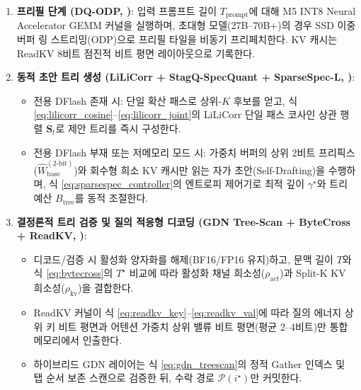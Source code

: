 \documentclass[10pt,a4paper]{article}
\begin{document}
{\begin{enumerate}
  \item \textbf{프리필 단계 (\textsf{DQ-ODP}, \cite{panferov2026dq})}: 입력 프롬프트 길이 $T_{\text{prompt}}$에 대해 M5 INT8 Neural Accelerator GEMM 커널을 실행하며, 초대형 모델(27B--70B+)의 경우 SSD 이중 버퍼 링 스트리밍(ODP)으로 프리필 타일을 비동기 프리페치한다. KV 캐시는 \textsf{ReadKV} 8비트 점진적 비트 평면 레이아웃으로 기록한다.
  \item \textbf{동적 초안 트리 생성 (\textsf{LiLiCorr} + \textsf{StagQ-SpecQuant} + \textsf{SparseSpec-L}, \cite{rusanovsky2026lilicorr,specquant2026,liu2026sparsespec})}:
  \begin{itemize}\setlength{\itemsep}{1pt}\setlength{\parskip}{0pt}
    \item 전용 \textsf{DFlash} 존재 시: 단일 확산 패스로 상위-$K$ 후보를 얻고, 식 \eqref{eq:lilicorr_cosine}--\eqref{eq:lilicorr_joint}의 \textsf{LiLiCorr} 단일 패스 코사인 상관 행렬 $\mathbf{S}_t$로 제안 트리를 즉시 구성한다.
    \item 전용 \textsf{DFlash} 부재 또는 저메모리 모드 시: 가중치 버퍼의 상위 2비트 프리픽스($\widehat{W}_{\text{base}}^{(2\text{-bit})}$)와 회수형 희소 KV 캐시만 읽는 자가 초안(Self-Drafting)을 수행하며, 식 \eqref{eq:sparsespec_controller}의 엔트로피 제어기로 최적 깊이 $\gamma^\star$와 트리 예산 $B_{\text{tree}}$를 동적 조절한다.
  \end{itemize}
  \item \textbf{결정론적 트리 검증 및 질의 적응형 디코딩 (\textsf{GDN Tree-Scan} + \textsf{ByteCross} + \textsf{ReadKV}, \cite{ma2026gdntreescan,lee2026bytecross,bhandari2026readkv})}:
  \begin{itemize}\setlength{\itemsep}{1pt}\setlength{\parskip}{0pt}
    \item 디코드/검증 시 활성화 양자화를 해제(BF16/FP16 유지)하고, 문맥 길이 $T$와 식 \eqref{eq:bytecross}의 $T^\star$ 비교에 따라 활성화 채널 희소성($\rho_{\text{act}}$)과 Split-K KV 희소성($\rho_{\text{kv}}$)을 결합한다.
    \item \textsf{ReadKV} 커널이 식 \eqref{eq:readkv_key}--\eqref{eq:readkv_val}에 따라 질의 에너지 상위 키 비트 평면과 어텐션 가중치 상위 밸류 비트 평면(평균 2--4비트)만 통합 메모리에서 인출한다.
    \item 하이브리드 GDN 레이어는 식 \eqref{eq:gdn_treescan}의 정적 Gather 인덱스 및 탭 순서 보존 스캔으로 검증한 뒤, 수락 경로 $\mathcal{P}(i^\star)$만 커밋한다.
  \end{itemize}
\end{enumerate}%
}
\end{document}
